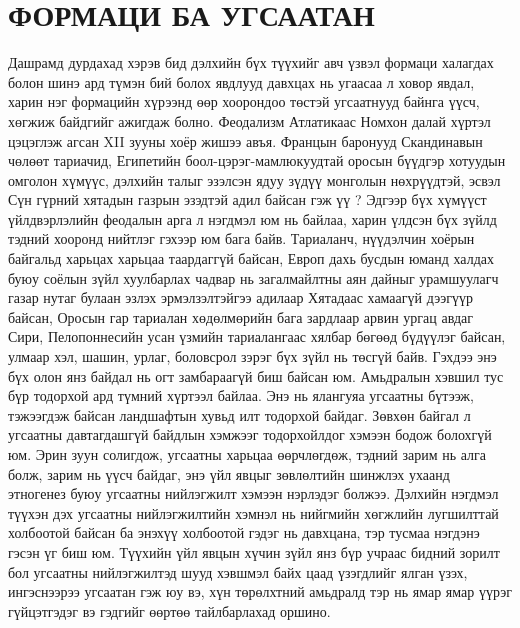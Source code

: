 \section{ФОРМАЦИ БА УГСААТАН}
Дашрамд дурдахад хэрэв бид дэлхийн бүх түүхийг авч үзвэл формаци халагдах болон шинэ ард түмэн бий болох явдлууд давхцах нь угаасаа л ховор явдал, харин нэг формацийн хүрээнд өөр хоорондоо төстэй угсаатнууд байнга үүсч, хөгжиж байдгийг ажигдаж болно.
Феодализм Атлатикаас Номхон далай хүртэл цэцэглэж агсан XII зууны хоёр жишээ авъя. Францын баронууд Скандинавын чөлөөт тариачид, Египетийн боол-цэрэг-мамлюкуудтай оросын бүүдгэр хотуудын омголон хүмүүс, дэлхийн талыг эзэлсэн ядуу зүдүү монголын нөхрүүдтэй, эсвэл Сүн гүрний хятадын газрын эзэдтэй адил байсан гэж үү ? Эдгээр бүх хүмүүст үйлдвэрлэлийн феодалын арга л нэгдмэл юм нь байлаа, харин үлдсэн бүх зүйлд тэдний хооронд нийтлэг гэхээр юм бага байв. Тариаланч, нүүдэлчин хоёрын байгальд харьцах харьцаа таардаггүй байсан, Европ дахь бусдын юманд халдах буюу соёлын зүйл хуулбарлах чадвар нь загалмайлтны аян дайныг урамшуулагч газар нутаг булаан эзлэх эрмэлзэлтэйгээ адилаар Хятадаас хамаагүй дээгүүр байсан, Оросын гар тариалан хөдөлмөрийн бага зардлаар арвин ургац авдаг Сири, Пелопоннесийн усан үзмийн тариалангаас хялбар бөгөөд бүдүүлэг байсан, улмаар хэл, шашин, урлаг, боловсрол зэрэг бүх зүйл нь төсгүй байв. Гэхдээ энэ бүх олон янз байдал нь огт замбараагүй биш байсан юм. Амьдралын хэвшил тус бүр тодорхой ард түмний хүртээл байлаа. Энэ нь ялангуяа угсаатны бүтээж, тэжээгдэж байсан ландшафтын хувьд илт тодорхой байдаг.
Зөвхөн байгал л угсаатны давтагдашгүй байдлын хэмжээг тодорхойлдог хэмээн бодож болохгүй юм. Эрин зуун солигдож, угсаатны харьцаа өөрчлөгдөж, тэдний зарим нь алга болж, зарим нь үүсч байдаг, энэ үйл явцыг зөвлөлтийн шинжлэх ухаанд этногенез буюу угсаатны нийлэгжилт хэмээн нэрлэдэг болжээ. Дэлхийн нэгдмэл түүхэн дэх угсаатны нийлэгжилтийн хэмнэл нь нийгмийн хөгжлийн лугшилттай холбоотой байсан ба энэхүү холбоотой гэдэг нь давхцана, тэр тусмаа нэгдэнэ гэсэн үг биш юм. Түүхийн үйл явцын хүчин зүйл янз бүр учраас бидний зорилт бол угсаатны нийлэгжилтэд шууд хэвшмэл байх цаад үзэгдлийг ялган үзэх, ингэснээрээ угсаатан гэж юу вэ, хүн төрөлхтний амьдралд тэр нь ямар ямар үүрэг гүйцэтгэдэг вэ гэдгийг өөртөө тайлбарлахад оршино.
